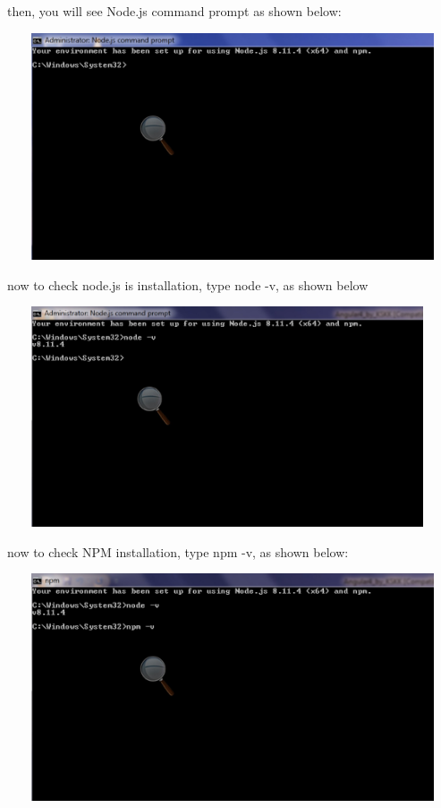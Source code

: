 \documentclass{article}
\begin{document}
\begin{enumerate}
\begin{enumerate}
	  	\noindent then, you will see Node.js command prompt as shown below:
	  	
	  	\begin{center}
	  		\noindent \includegraphics*[width=5.40in, height=2.64in]{IMG-01-10}
	  	\end{center}
	  	
	  	\noindent now to check node.js is installation, type node -v, as shown below
	  	
	  	\begin{center}
	  		\noindent \includegraphics*[width=5.12in, height=2.56in]{IMG-01-11}
	  	\end{center} 
	  	
	  	\noindent now to check NPM installation, type npm -v, as shown below:
	  	
	  	\begin{center}
	  		\noindent \includegraphics*[width=5.40in, height=2.64in]{IMG-01-12}
	  	\end{center}
	  	

\end{enumerate}
\end{enumerate}
\end{document}
